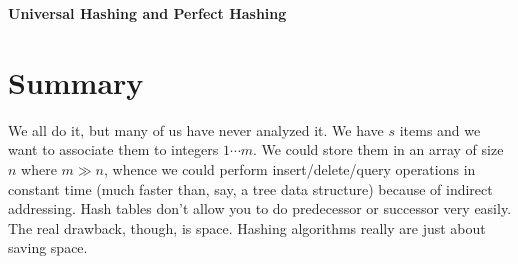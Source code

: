 \documentclass{article}
\begin{document}
\newcommand{\mod}{\hbox{mod }}

%


%
%
%
%

%




\begin{center}
{\large \bf Universal Hashing and Perfect Hashing}
\end{center}

\section{Summary}

We all do it, but many of us have never analyzed it.  We have $s$ items
and we want to associate them to integers $1\cdots m$.
We could store them in an array of size $n$ where $m \gg n$, whence we could perform
insert/delete/query operations in constant time (much faster than, say,
a tree data structure) because of indirect addressing.  Hash tables don't
allow you to do predecessor or successor very easily.  The real drawback,
though, is space.  Hashing algorithms really are just about saving space.
\end{document}
